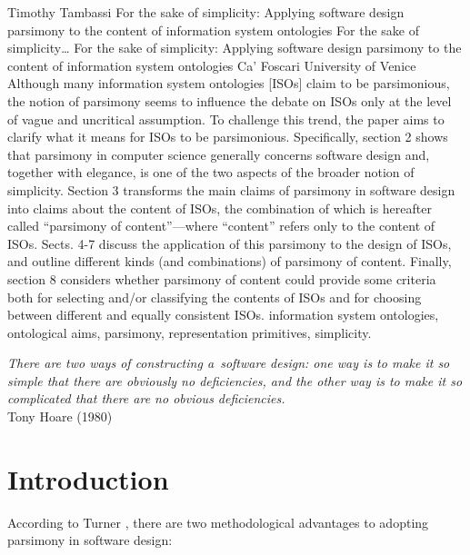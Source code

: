 \begin{artengenv}{Timothy Tambassi}
	{For the sake of simplicity: Applying software design parsimony to the content of information system ontologies}
	{For the sake of simplicity\ldots}
	{For the sake of simplicity: Applying software design parsimony to the content of information system ontologies}
	{Ca' Foscari University of Venice}
	{Although many information system ontologies [ISOs] claim to be parsimonious, the notion of parsimony seems to influence the debate on ISOs only at the level of vague and uncritical assumption. To challenge this trend, the paper aims to clarify what it means for ISOs to be parsimonious. Specifically, section 2 shows that parsimony in computer science generally concerns software design and, together with elegance, is one of the two aspects of the broader notion of simplicity. Section 3 transforms the main claims of parsimony in software design into claims about the content of ISOs, the combination of which is hereafter called ``parsimony of content''---where ``content'' refers only to the content of ISOs. Sects. 4-7 discuss the application of this parsimony to the design of ISOs, and outline different kinds (and combinations) of parsimony of content. Finally, section 8 considers whether parsimony of content could provide some criteria both for selecting and/or classifying the contents of ISOs and for choosing between different and equally consistent ISOs.
	}
	{information system ontologies, ontological aims, parsimony, representation primitives, simplicity.}

\begin{customepigraph}
\textit{There are two ways of constructing a~software design:
one way is to make it so simple that there are obviously no deficiencies,
and the other way is to make it so complicated that there are no obvious deficiencies.
} \\
Tony Hoare (1980)
\end{customepigraph}



\section{Introduction}

According to Turner 
\parencite*[][]{turner_computational_2018}, %
 there are two methodological advantages to adopting parsimony in software design:




\end{artengenv}
